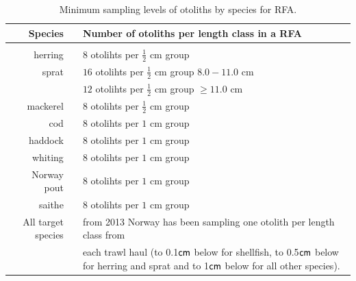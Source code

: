 \documentclass[a4paper 12pt]{article}
\numberwithin{equation}{section}
\newcommand{\cm}{\textnormal{\sffamily cm}\xspace}
\begin{document}
\clearpage
\begin{table}[h!]
\centering
\caption{Minimum sampling levels of otoliths by species for RFA.}
\label{otolithsTable}
\begin{tabularx}{\linewidth}{r l X}
\toprule 
 Species   	&  & Number of otoliths per length class in a RFA    \\[0.7ex]
\midrule \\[0.5ex]
 herring    	&  & $8$  otolihts per $\frac{1}{2}$ cm group \\[0.8ex]
sprat       &  & $16$  otolihts per $\frac{1}{2}$ cm group $8.0 -11.0$ cm\\[0.8ex]
            &  & $12$  otolihts per $\frac{1}{2}$ cm group $\geq 11.0$ cm\\[0.8ex]
mackerel    &  & $8$  otolihts per $\frac{1}{2}$ cm group \\[0.8ex]
cod       	&  & $8$  otolihts per $1$ cm group \\[0.8ex]
haddock   	&  & $8$  otolihts per $1$ cm group \\[0.8ex]
whiting    	&  & $8$  otolihts per $1$ cm group \\[0.8ex]
Norway pout &  & $8$  otolihts per $1$ cm group \\[0.8ex]
saithe      &  & $8$  otolihts per $1$ cm group \\[2ex] 
All target species    &  & from 2013 Norway has been sampling one otolith per length class from \\[0.7ex] 
&& each trawl haul (to 0.1$\cm$ below for shellfish, to 0.5$\cm$ below for herring and sprat and to 1$\cm$ below for all other species).\\[0.7ex] 
\bottomrule         
\end{tabularx}
\end{table}
\end{document}
